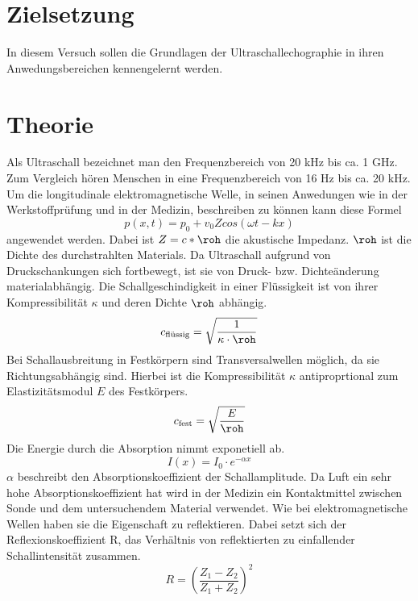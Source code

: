 \section{Zielsetzung}
In diesem Versuch sollen die Grundlagen der Ultraschallechographie
in ihren Anwedungsbereichen kennengelernt werden.
\section{Theorie}
Als Ultraschall bezeichnet man den Frequenzbereich von 20 kHz bis ca. 1 GHz.
Zum Vergleich hören Menschen in eine Frequenzbereich von 16 Hz bis ca. 20 kHz.
Um die longitudinale elektromagnetische Welle, in seinen Anwedungen wie in der Werkstoffprüfung
und in der Medizin, beschreiben zu können kann diese Formel
\begin{equation}
  p(x,t)= p_0 + v_0 Z cos(\omega t - k x)
  \label{eq:1}
\end{equation}
angewendet werden.
Dabei ist $Z = c* \roh$ die akustische Impedanz. $\roh$ ist die Dichte des durchstrahlten Materials.
Da Ultraschall aufgrund von Druckschankungen sich fortbewegt, ist sie von Druck- bzw. Dichteänderung materialabhängig.
Die Schallgeschindigkeit in einer Flüssigkeit ist von ihrer Kompressibilität $\kappa$ und deren Dichte $\roh$
abhängig.
\begin{equation}
  c_{\text{flüssig}} = \sqrt{\frac{1}{\kappa \cdot \roh}}
  \label{eq:2}
\end{equation}
Bei Schallausbreitung in Festkörpern sind Transversalwellen möglich, da sie Richtungsabhängig sind.
Hierbei ist die Kompressibilität $\kappa$ antiproprtional zum Elastizitätsmodul $E$ des Festkörpers.
\begin{equation}
  c_{\text{fest}} = \sqrt{\frac{E}{\roh}}
  \label{eq:3}
\end{equation}
Die Energie durch die Absorption nimmt exponetiell ab.
\begin{equation}
  I(x) =I_0 \cdot e^{-\alpha x}
  \label{eq:4}
\end{equation}
$\alpha$ beschreibt den Absorptionskoeffizient der Schallamplitude.
Da Luft ein sehr hohe Absorptionskoeffizient hat wird in der Medizin ein Kontaktmittel
zwischen Sonde und dem untersuchendem Material verwendet.
Wie bei elektromagnetische Wellen haben sie die Eigenschaft zu reflektieren.
Dabei setzt sich der Reflexionskoeffizient R, das Verhältnis von reflektierten zu einfallender Schallintensität zusammen.
\begin{equation}
  R = (\frac{Z_1 - Z_2} {Z_1 + Z_2})^2
  \label{eq:5}
\end{equation}
